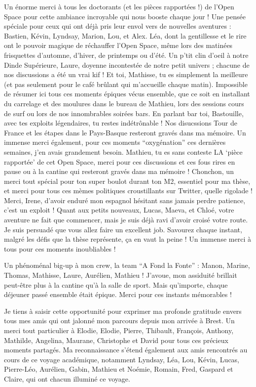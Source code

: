 \begin{refsection}
Un énorme merci à tous les doctorants (et les pièces rapportées !) de
l'Open Space pour cette ambiance incroyable qui nous booste chaque jour
! Une pensée spéciale pour ceux qui ont déjà pris leur envol vers de
nouvelles aventures : Bastien, Kévin, Lyndsay, Marion, Lou, et Alex.
Léa, dont la gentillesse et le rire ont le pouvoir magique de réchauffer
l'Open Space, même lors des matinées frisquettes d'automne, d'hiver, de
printemps ou d'été. Un p'tit clin d'oeil à notre Dinde Supérieure,
Laure, doyenne incontestée de notre petit univers ; chacune de nos
discussions a été un vrai kif ! Et toi, Mathisse, tu es simplement la
meilleure (et pas seulement pour le café brûlant qui m'accueille chaque
matin). Impossible de résumer ici tous ces moments épiques vécus
ensemble, que ce soit en installant du carrelage et des moulures dans le
bureau de Mathieu, lors des sessions cours de surf ou lors de nos
innombrables soirées bars. En parlant bar toi, Bastouille, avec tes
exploits légendaires, tu restes indétrônable ! Nos disucssions Tour de
France et les étapes dans le Pays-Basque resteront gravés dans ma
mémoire. Un immense merci également, pour ces moments ``oxygénation''
ces dernières semaines, j'en avais grandement besoin. Mathieu, tu es
sans conteste LA `pièce rapportée' de cet Open Space, merci pour ces
discussions et ces fous rires en pause ou à la cantine qui resteront
gravés dans ma mémoire ! Chonchon, un merci tout spécial pour ton super
boulot durant ton M2, essentiel pour ma thèse, et merci pour tous ces
mèmes politiques croustillants sur Twitter, quelle rigolade ! Merci,
Irene, d'avoir enduré mon espagnol hésitant sans jamais perdre patience,
c'est un exploit ! Quant aux petits nouveaux, Lucas, Maeva, et Chloé,
votre aventure ne fait que commencer, mais je suis déjà ravi d'avoir
croisé votre route. Je suis persuadé que vous allez faire un excellent
job. Savourez chaque instant, malgré les défis que la thèse représente,
ça en vaut la peine ! Un immense merci à tous pour ces moments
inoubliables !

Un phénoménal big-up à mon crew, la team ``A Fond la Fonte'' : Manon,
Marine, Thomas, Mathisse, Laure, Aurélien, Mathieu ! J'avoue, mon
assiduité brillait peut-être plus à la cantine qu'à la salle de sport.
Mais qu'importe, chaque déjeuner passé ensemble était épique. Merci pour
ces instants mémorables !

Je tiens à saisir cette opportunité pour exprimer ma profonde gratitude
envers tous mes amis qui ont jalonné mon parcours depuis mon arrivée à
Brest. Un merci tout particulier à Elodie, Elodie, Pierre, Thibault,
François, Anthony, Mathilde, Angelina, Maurane, Christophe et David pour
tous ces précieux moments partagés. Ma reconnaissance s'étend également
aux amis rencontrés au cours de ce voyage académique, notamment Lyndsay,
Léa, Lou, Kévin, Lucas, Pierre-Léo, Aurélien, Gabin, Mathieu et Noémie,
Romain, Fred, Gaspard et Claire, qui ont chacun illuminé ce voyage.


\end{refsection}
